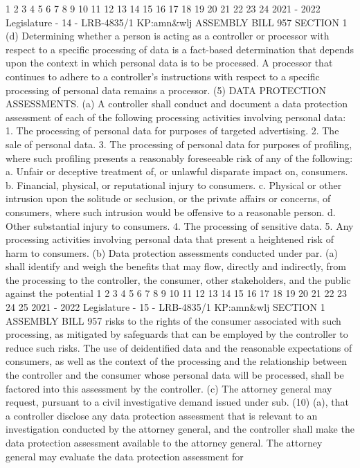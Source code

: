 1
2
3
4
5
6
7
8
9
10
11
12
13
14
15
16
17
18
19
20
21
22
23
24
2021 - 2022 Legislature - 14 - LRB-4835/1
KP:amn&wlj
 ASSEMBLY BILL 957 SECTION 1
(d) Determining whether a person is acting as a controller or processor with
respect to a specific processing of data is a fact-based determination that depends
upon the context in which personal data is to be processed. A processor that
continues to adhere to a controller's instructions with respect to a specific processing
of personal data remains a processor.
(5) DATA PROTECTION ASSESSMENTS. (a) A controller shall conduct and document
a data protection assessment of each of the following processing activities involving
personal data:
1. The processing of personal data for purposes of targeted advertising.
2. The sale of personal data.
3. The processing of personal data for purposes of profiling, where such
profiling presents a reasonably foreseeable risk of any of the following:
a. Unfair or deceptive treatment of, or unlawful disparate impact on,
consumers.
b. Financial, physical, or reputational injury to consumers.
c. Physical or other intrusion upon the solitude or seclusion, or the private
affairs or concerns, of consumers, where such intrusion would be offensive to a
reasonable person.
d. Other substantial injury to consumers.
4. The processing of sensitive data.
5. Any processing activities involving personal data that present a heightened
risk of harm to consumers.
(b) Data protection assessments conducted under par. (a) shall identify and
weigh the benefits that may flow, directly and indirectly, from the processing to the
controller, the consumer, other stakeholders, and the public against the potential
1
2
3
4
5
6
7
8
9
10
11
12
13
14
15
16
17
18
19
20
21
22
23
24
25
2021 - 2022 Legislature - 15 - LRB-4835/1
KP:amn&wlj
SECTION 1 ASSEMBLY BILL 957
risks to the rights of the consumer associated with such processing, as mitigated by
safeguards that can be employed by the controller to reduce such risks. The use of
deidentified data and the reasonable expectations of consumers, as well as the
context of the processing and the relationship between the controller and the
consumer whose personal data will be processed, shall be factored into this
assessment by the controller.
(c) The attorney general may request, pursuant to a civil investigative demand
issued under sub. (10) (a), that a controller disclose any data protection assessment
that is relevant to an investigation conducted by the attorney general, and the
controller shall make the data protection assessment available to the attorney
general. The attorney general may evaluate the data protection assessment for
